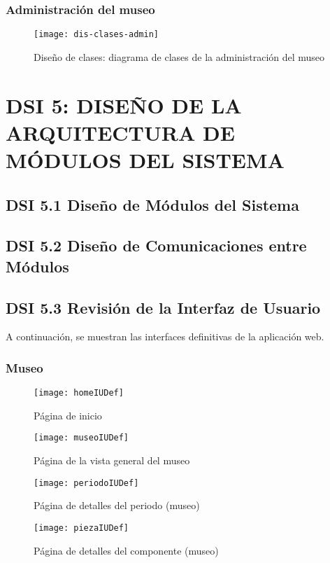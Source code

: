 \subsubsection{Administración del museo}
\begin{figure}[H]
\centering
\centerline{\texttt{[image: dis-clases-admin]}}
\caption{Diseño de clases: diagrama de clases de la administración del museo}
\end{figure}

\newpage
\section{DSI 5: DISEÑO DE LA ARQUITECTURA DE MÓDULOS DEL SISTEMA}

\subsection{DSI 5.1 Diseño de Módulos del Sistema}

\subsection{DSI 5.2 Diseño de Comunicaciones entre Módulos}

\subsection{DSI 5.3 Revisión de la Interfaz de Usuario}
A continuación, se muestran las interfaces definitivas de la aplicación web.
\subsubsection{Museo}
\begin{figure}[H]
\centering
\texttt{[image: homeIUDef]}
\caption{Página de inicio}
\end{figure}
\begin{figure}[H]
\centering
\texttt{[image: museoIUDef]}
\caption{Página de la vista general del museo}
\end{figure}
\begin{figure}[H]
\centering
\texttt{[image: periodoIUDef]}
\caption{Página de detalles del periodo (museo)}
\end{figure}
\begin{figure}[H]
\centering
\texttt{[image: piezaIUDef]}
\caption{Página de detalles del componente (museo)}
\end{figure}

